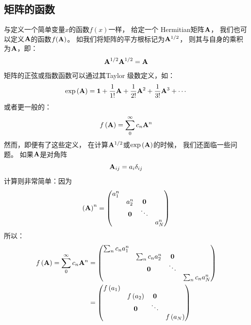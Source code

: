 \subsection{矩阵的函数}
\label{sec:1.1.7}
与定义一个简单变量$x$的函数$f(x)$一样，
给定一个 Hermitian矩阵$\mathbf{A}$，
我们也可以定义$\mathbf{A}$的函数$f(\mathbf{A})$。
如我们将矩阵的平方根标记为$\mathbf{A}^{1/2}$，
则其与自身的乘积为$\mathbf{A}$，即：
\begin{equation}
 \mathbf{A}^{1/2}\mathbf{A}^{1/2} = \mathbf{A}
 \label{eq:1.108}
\end{equation} 
矩阵的正弦或指数函数可以通过其Taylor 级数定义，如：
\[\exp\left(\mathbf{A}\right) = \mathbf{1} + \frac{1}{1!}\mathbf{A} + \frac{1}{2!}\mathbf{A}^2 + \frac{1}{3!}\mathbf{A}^3 + \cdots\]
或者更一般的：
\begin{equation}
 f\left(\mathbf{A}\right) = \sum_0^{\infty}c_n \mathbf{A}^n
 \label{eq:1.109}
\end{equation}
然而，即便有了这些定义，
在计算$\mathbf{A}^{1/2}$或$\exp\left(\mathbf{A}\right)$的时候，
我们还面临一些问题。
如果$\mathbf{A}$是对角阵
\[\mathbf{A}_{ij} = a_i\delta_{ij}\]
计算则非常简单：因为
\begin{equation}
 \left(\mathbf{A}\right)^n = \begin{pmatrix}
     a_1^n &               &      & \\
                    &a_2^n &\mathbf{0} & \\
           &\mathbf{0} &\ddots & \\
           &               &                &a_N^n
 \end{pmatrix}
 \label{eq:1.110}
\end{equation}
所以：
\begin{equation}
 \begin{split}
     f\left(\mathbf{A}\right) = \sum_0^{\infty}c_n \mathbf{A}^n &= \begin{pmatrix}
      \sum_n c_n a_1^n &               &      & \\
                     &\sum_n c_n a_2^n &\mathbf{0} & \\
               &\mathbf{0} &\ddots & \\
               &               &                &\sum_n c_n a_N^n
     \end{pmatrix} \\
     &= \begin{pmatrix}
      f\left(a_1\right) &               &      & \\
                     &f\left(a_2\right) &\mathbf{0} & \\
               &\mathbf{0} &\ddots & \\
               &               &                &f\left(a_N\right)
     \end{pmatrix}
 \end{split}
 \label{eq:1.111}
\end{equation}
